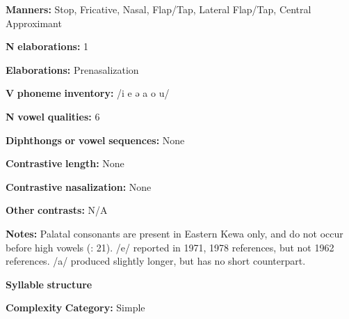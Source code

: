 \documentclass[output=paper]{langsci/langscibook}
\begin{document}
\begin{styleBody}
\textbf{Manners:} Stop, Fricative, Nasal, Flap/Tap, Lateral Flap/Tap, Central Approximant
\end{styleBody}

\begin{styleBody}
\textbf{N} \textbf{elaborations:} 1
\end{styleBody}

\begin{styleBody}
\textbf{Elaborations:} Prenasalization
\end{styleBody}

\begin{styleBody}
\textbf{V} \textbf{phoneme} \textbf{inventory:} /i e ə a o u/
\end{styleBody}

\begin{styleBody}
\textbf{N} \textbf{vowel} \textbf{qualities:} 6
\end{styleBody}

\begin{styleBody}
\textbf{Diphthongs} \textbf{or} \textbf{vowel} \textbf{sequences:} None
\end{styleBody}

\begin{styleBody}
\textbf{Contrastive} \textbf{length:} None
\end{styleBody}

\begin{styleBody}
\textbf{Contrastive} \textbf{nasalization:} None
\end{styleBody}

\begin{styleBody}
\textbf{Other} \textbf{contrasts:} N/A
\end{styleBody}

\begin{styleBody}
\textbf{Notes:} Palatal consonants are present in Eastern Kewa only, and do not occur before high vowels (\citealt{FranklinFranklin1978}: 21). /e/ reported in 1971, 1978 references, but not 1962 references. /a/ produced slightly longer, but has no short counterpart.
\end{styleBody}

\begin{styleBody}
\textbf{Syllable} \textbf{structure}
\end{styleBody}

\begin{styleBody}
\textbf{Complexity} \textbf{Category:} Simple
\end{styleBody}
\end{document}
